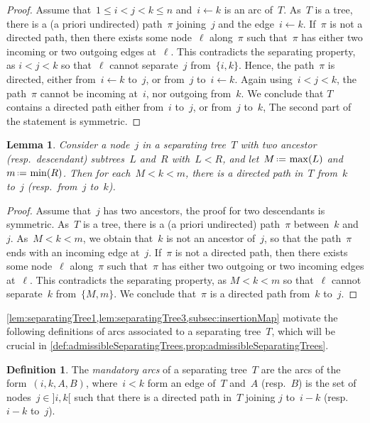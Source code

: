 \documentclass{amsart}
\newtheorem{lemma}[theorem]{Lemma}
\theoremstyle{definition}
\newtheorem{definition}[theorem]{Definition}
\newcommand{\eqdef}{\mbox{\,\raisebox{0.2ex}{\scriptsize\ensuremath{\mathrm:}}\ensuremath{=}\,}} %
\newcommand{\darkblue}{\color{darkblue}} %
\newcommand{\defn}[1]{\textsl{\darkblue #1}} %
\begin{document}
\begin{proof}
Assume that~$1 \le i < j < k \le n$ and~$i \leftarrow k$ is an arc of~$T$.
As~$T$ is a tree, there is a (a priori undirected) path~$\pi$ joining~$j$ and the edge~$i \leftarrow k$.
If~$\pi$ is not a directed path, then there exists some node~$\ell$ along~$\pi$ such that~$\pi$ has either two incoming or two outgoing edges at~$\ell$.
This contradicts the separating property, as $i < j < k$ so that~$\ell$ cannot separate~$j$ from~$\{i,k\}$.
Hence, the path~$\pi$ is directed, either from~$i \leftarrow k$ to~$j$, or from~$j$ to~$i \leftarrow k$.
Again using~$i < j < k$, the path~$\pi$ cannot be incoming at~$i$, nor outgoing from~$k$.
We conclude that $T$ contains a directed path either from~$i$ to~$j$, or from~$j$ to~$k$,
The second part of the statement is symmetric.
\end{proof}

\begin{lemma}
\label{lem:separatingTree3}
Consider a node~$j$ in a separating tree~$T$ with two ancestor (resp.~descendant) subtrees~$L$ and~$R$ with~$L < R$, and let~$M \eqdef \max(L)$ and~$m \eqdef \min(R)$. Then for each~${M < k < m}$, there is a directed path in~$T$ from~$k$ to~$j$ (resp.~from~$j$ to~$k$).
\end{lemma}

\begin{proof}
Assume that~$j$ has two ancestors, the proof for two descendants is symmetric.
As~$T$ is a tree, there is a (a priori undirected) path~$\pi$ between~$k$ and~$j$.
As~$M < k < m$, we obtain that~$k$ is not an ancestor of~$j$, so that the path~$\pi$ ends with an incoming edge at~$j$.
If~$\pi$ is not a directed path, then there exists some node~$\ell$ along~$\pi$ such that~$\pi$ has either two outgoing or two incoming edges at~$\ell$.
This contradicts the separating property, as $M < k < m$ so that~$\ell$ cannot separate~$k$ from~$\{M,m\}$.
We conclude that~$\pi$ is a directed path from~$k$ to~$j$.
\end{proof}

\cref{lem:separatingTree1,lem:separatingTree3,subsec:insertionMap} motivate the following definitions of arcs associated to a separating tree~$T$, which will be crucial in \cref{def:admissibleSeparatingTrees,prop:admissibleSeparatingTrees}.

\begin{definition}
\label{def:arcsSeparatingTree}
The \defn{mandatory arcs} of a separating tree~$T$ are the arcs of the form~$(i, k, A, B)$, where~$i < k$ form an edge of~$T$ and~$A$ (resp.~$B$) is the set of nodes~$j \in {]i,k[}$ such that there is a directed path in~$T$ joining $j$ to~$i-k$ (resp.~$i-k$ to~$j$).
\end{definition}
\end{document}
